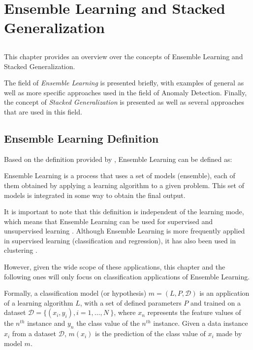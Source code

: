 \chapter{Ensemble Learning and Stacked Generalization} \label{chap:ensemble}

\section*{}

This chapter provides an overview over the concepts of Ensemble Learning and Stacked Generalization.

The field of \textit{Ensemble Learning} is presented briefly, with examples of general as well as more specific approaches used in the field of Anomaly Detection. 
Finally, the concept of \textit{Stacked Generalization} is presented as well as several approaches that are used in this field.

\section{Ensemble Learning Definition}\label{sec:ensemble_def}

Based on the definition provided by \textcite{Mendes-Moreira2012}, Ensemble Learning can be defined as:

\begin{definition} \label{def:ensemble_learning}
	Ensemble Learning is a process that uses a set of models (ensemble), each of them obtained by applying a learning algorithm to a given problem. This set of models is integrated in some way to obtain the final output.
\end{definition}

It is important to note that this definition is independent of the learning mode, which means that Ensemble Learning can be used for supervised and unsupervised learning \cite{Mendes-Moreira2012}.
Although Ensemble Learning is more frequently applied in supervised learning (classification and regression), it has also been used in clustering \cite{Strehl:2003:CEK:944919.944935}.

However, given the wide scope of these applications, this chapter and the following ones will only focus on classification applications of Ensemble Learning.

Formally, a classification model (or hypothesis) $m = (L, P, \mathcal{D})$ is an application of a learning algorithm $L$, with a set of defined parameters $P$ and trained on a dataset $\mathcal{D} = \{(x_i, y_i), i = 1, \dots, N\ \}$, where $x_n$ represents the feature values of the $n^{th}$ instance and $y_n$ the class value of the $n^{th}$ instance.
Given a data instance $x_i$ from a dataset $\mathcal{D}$, $m(x_i)$ is the prediction of the class value of $x_i$ made by model $m$.

